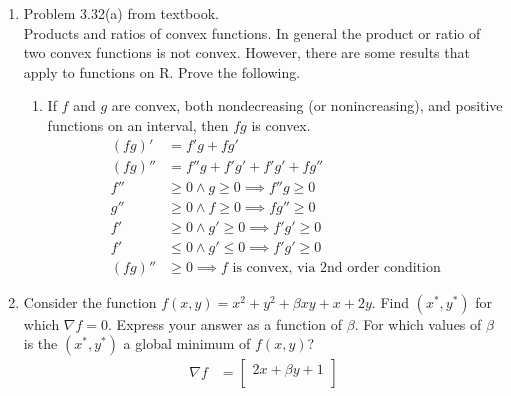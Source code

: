 \documentclass[12pt,letter]{article}
\newcommand{\set}[1]{\{#1\}}
\begin{document}
\begin{enumerate}
\begin{enumerate}
  \end{enumerate}

  \pagebreak
  
\item Problem 3.32(a) from textbook.\\
  Products and ratios of convex functions. In general the product or ratio of two convex functions is not convex. However, there are some results that apply to functions on R. Prove the following.
  \begin{enumerate}
  \item If $f$ and $g$ are convex, both nondecreasing (or nonincreasing), and positive functions on an interval, then $fg$ is convex.
    \begin{align*}
      (fg)'&=f'g+fg'\\
      (fg)''&=f''g+f'g'+f'g'+fg''\\
      f'' &\geq 0 \wedge g \geq 0 \implies f''g \geq 0\\
      g'' &\geq 0 \wedge f \geq 0 \implies fg'' \geq 0\\
      f' &\geq 0 \wedge g' \geq 0 \implies f'g' \geq 0\\
      f' &\leq 0 \wedge g' \leq 0 \implies f'g' \geq 0\\
      (fg)'' & \geq 0 \implies f \text{ is convex, via 2nd order condition}
    \end{align*}
  \end{enumerate}
\item Consider the function $f(x, y) = x^2 + y^2 + \beta x y + x + 2y$. Find $(x^* , y^* )$ for which $\nabla f = 0$. Express your answer as a function of $\beta$. For which values of $\beta$ is the $(x^* , y^* )$ a global minimum of $f(x, y)$?
  \begin{align*}
    \nabla f & =
               \begin{bmatrix}
                 2x + \beta y +1 \\

\end{bmatrix}
\end{align*}
\end{enumerate}
\end{document}
